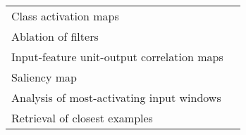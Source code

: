 \begin{tabular}{ll}
Class activation maps                                  &                                                                                                                                                                                  \cite{Ghosh2018} \\
Ablation of filters                                    &                                                                                                                                                                                \cite{Lawhern2018} \\
Input-feature unit-output correlation maps             &                                                                                                                                                                          \cite{Schirrmeister2017} \\
Saliency map                                           &                                                                                                                                                                               \cite{Vilamala2017} \\
Analysis of most-activating input windows              &                                                                                                                                                                              \cite{Hartmann2018b} \\
Retrieval of closest examples                          &                                                                                                                                                                                  \cite{Deiss2018} \\
\bottomrule
\end{tabular}
